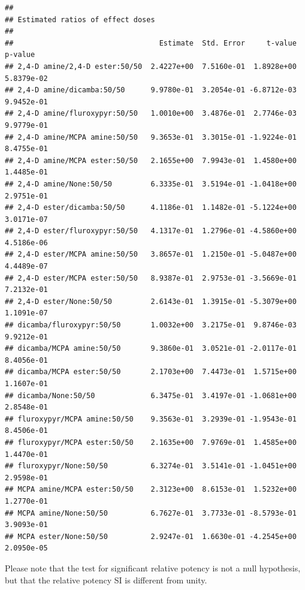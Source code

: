 \documentclass[letterpaper,]{book}
\begin{document}
\begin{verbatim}
## 
## Estimated ratios of effect doses
## 
##                                  Estimate  Std. Error     t-value     p-value
## 2,4-D amine/2,4-D ester:50/50  2.4227e+00  7.5160e-01  1.8928e+00  5.8379e-02
## 2,4-D amine/dicamba:50/50      9.9780e-01  3.2054e-01 -6.8712e-03  9.9452e-01
## 2,4-D amine/fluroxypyr:50/50   1.0010e+00  3.4876e-01  2.7746e-03  9.9779e-01
## 2,4-D amine/MCPA amine:50/50   9.3653e-01  3.3015e-01 -1.9224e-01  8.4755e-01
## 2,4-D amine/MCPA ester:50/50   2.1655e+00  7.9943e-01  1.4580e+00  1.4485e-01
## 2,4-D amine/None:50/50         6.3335e-01  3.5194e-01 -1.0418e+00  2.9751e-01
## 2,4-D ester/dicamba:50/50      4.1186e-01  1.1482e-01 -5.1224e+00  3.0171e-07
## 2,4-D ester/fluroxypyr:50/50   4.1317e-01  1.2796e-01 -4.5860e+00  4.5186e-06
## 2,4-D ester/MCPA amine:50/50   3.8657e-01  1.2150e-01 -5.0487e+00  4.4489e-07
## 2,4-D ester/MCPA ester:50/50   8.9387e-01  2.9753e-01 -3.5669e-01  7.2132e-01
## 2,4-D ester/None:50/50         2.6143e-01  1.3915e-01 -5.3079e+00  1.1091e-07
## dicamba/fluroxypyr:50/50       1.0032e+00  3.2175e-01  9.8746e-03  9.9212e-01
## dicamba/MCPA amine:50/50       9.3860e-01  3.0521e-01 -2.0117e-01  8.4056e-01
## dicamba/MCPA ester:50/50       2.1703e+00  7.4473e-01  1.5715e+00  1.1607e-01
## dicamba/None:50/50             6.3475e-01  3.4197e-01 -1.0681e+00  2.8548e-01
## fluroxypyr/MCPA amine:50/50    9.3563e-01  3.2939e-01 -1.9543e-01  8.4506e-01
## fluroxypyr/MCPA ester:50/50    2.1635e+00  7.9769e-01  1.4585e+00  1.4470e-01
## fluroxypyr/None:50/50          6.3274e-01  3.5141e-01 -1.0451e+00  2.9598e-01
## MCPA amine/MCPA ester:50/50    2.3123e+00  8.6153e-01  1.5232e+00  1.2770e-01
## MCPA amine/None:50/50          6.7627e-01  3.7733e-01 -8.5793e-01  3.9093e-01
## MCPA ester/None:50/50          2.9247e-01  1.6630e-01 -4.2545e+00  2.0950e-05
\end{verbatim}

Please note that the test for significant relative potency is not a null hypothesis, but that the relative potency SI is different from unity.
\end{document}
